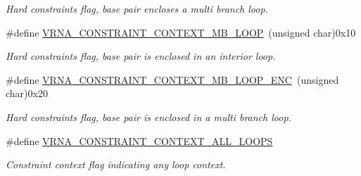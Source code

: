 \begin{DoxyCompactItemize}
\begin{DoxyCompactList}\small\item\em Hard constraints flag, base pair encloses a multi branch loop. \end{DoxyCompactList}\item 
\mbox{\label{group__hard__constraints_ga456ecd2ff00056bb64da8dd4f61bbfc5}} 
\#define \hyperlink{group__hard__constraints_ga456ecd2ff00056bb64da8dd4f61bbfc5}{V\+R\+N\+A\+\_\+\+C\+O\+N\+S\+T\+R\+A\+I\+N\+T\+\_\+\+C\+O\+N\+T\+E\+X\+T\+\_\+\+M\+B\+\_\+\+L\+O\+OP}~(unsigned char)0x10
\begin{DoxyCompactList}\small\item\em Hard constraints flag, base pair is enclosed in an interior loop. \end{DoxyCompactList}\item 
\mbox{\label{group__hard__constraints_ga02a3d703ddbcfce393e4bbfcb9db7077}} 
\#define \hyperlink{group__hard__constraints_ga02a3d703ddbcfce393e4bbfcb9db7077}{V\+R\+N\+A\+\_\+\+C\+O\+N\+S\+T\+R\+A\+I\+N\+T\+\_\+\+C\+O\+N\+T\+E\+X\+T\+\_\+\+M\+B\+\_\+\+L\+O\+O\+P\+\_\+\+E\+NC}~(unsigned char)0x20
\begin{DoxyCompactList}\small\item\em Hard constraints flag, base pair is enclosed in a multi branch loop. \end{DoxyCompactList}\item 
\mbox{\label{group__hard__constraints_ga886d9127c49bb982a4b67cd7581e8a5a}} 
\#define \hyperlink{group__hard__constraints_ga886d9127c49bb982a4b67cd7581e8a5a}{V\+R\+N\+A\+\_\+\+C\+O\+N\+S\+T\+R\+A\+I\+N\+T\+\_\+\+C\+O\+N\+T\+E\+X\+T\+\_\+\+A\+L\+L\+\_\+\+L\+O\+O\+PS}
\begin{DoxyCompactList}\small\item\em Constraint context flag indicating any loop context. \end{DoxyCompactList}\end{DoxyCompactItemize}
